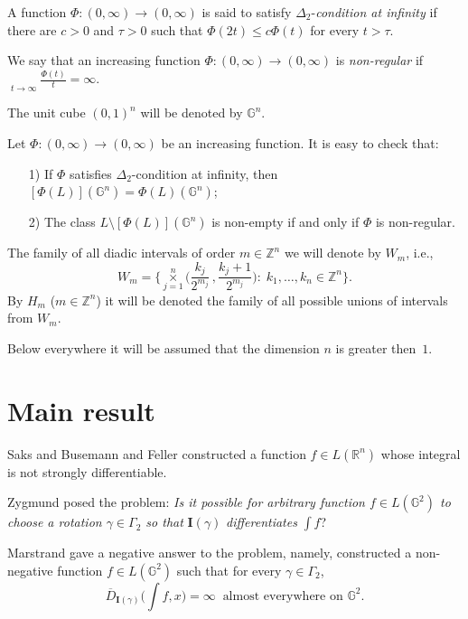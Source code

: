 \documentclass[12pt,reqno]{article}
\theoremstyle{remark}
\begin{document}
A function $\Phi: (0,\infty)\rightarrow (0,\infty)$ is said to satisfy $\Delta_2$-\emph{condition at infinity} if there are $c>0$ and $\tau> 0$ such that $\Phi(2t)\leq c\Phi(t)$ for every $t> \tau$.

We say that an increasing function $\Phi: (0,\infty)\rightarrow (0,\infty)$ is \emph{non-regular} if $\mathop{\overline{\lim}}\limits_{t\rightarrow\infty} \frac{\Phi(t)}{t}=\infty. $

The unit cube $(0,1)^n$ will be denoted by $\mathbb{G}^n$.

Let $\Phi: (0,\infty)\rightarrow (0,\infty)$ be an increasing function. It is easy to check that:
\begin{itemize}
\item[1)] If $\Phi$ satisfies $\Delta_2$-condition at infinity, then $[\Phi(L)](\mathbb{G}^n)=\Phi(L)(\mathbb{G}^n)$;

\item[2)] The class $L\setminus [\Phi(L)](\mathbb{G}^n)$ is non-empty if and only if $\Phi$ is non-regular.
\end{itemize}

The family of all diadic intervals of order $m\in\mathbb{Z}^n$ we will denote by $W_m$, i.e.,
$$  W_m=\bigg\{\underset{j=1}{\overset{n}{\times}} \Big(\frac{k_j}{2^{m_j}}\,,\frac{k_j+1}{2^{m_j}}\Big):\;k_1,\dots,k_n \in\mathbb{Z}^n\bigg\}.  $$
By $H_m$ ($m\in\mathbb{Z}^n$)  it will be denoted the family of all possible  unions of intervals from $W_m$.

 Below everywhere it will be assumed that the dimension $n$ is greater then~$1$.

\section{Main result}
\label{sec:2}

Saks \cite{1} and Busemann and Feller \cite{2} constructed a function $f\in L(\mathbb{R}^n)$ whose integral is not strongly differentiable.

Zygmund \cite[p.~99]{3} posed the problem: \emph{Is it possible for arbitrary function $f\in L(\mathbb{G}^2)$  to choose a rotation $\gamma\in\Gamma_2$ so that}  $\textbf{I}(\gamma)$ \emph{differentiates} $\int f$?

Marstrand \cite{4} gave a negative answer to the problem, namely, constructed a non-negative function $f\in L(\mathbb{G}^2)$ such that for every $\gamma\in\Gamma_2$,
$$  \overline{D}_{\textbf{I}(\gamma)}\Big(\int f,x\Big)=\infty \;\;\text{almost everywhere on $\mathbb{G}^2$}.      $$
\end{document}
